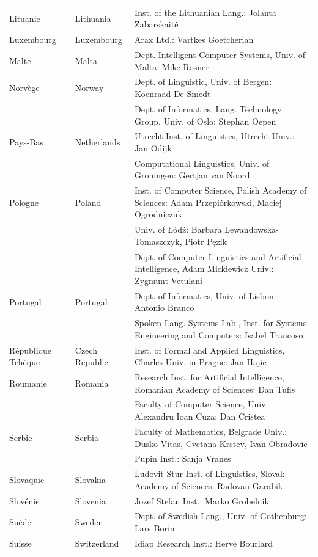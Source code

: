 \begin{longtable}{llp{105mm}}
  Lituanie & \textcolor{grey1}{Lithuania} & Inst. of the Lithuanian Lang.: Jolanta Zabarskaitė\\ \addlinespace
  Luxembourg & \textcolor{grey1}{Luxembourg} & Arax Ltd.: Vartkes Goetcherian\\ \addlinespace
  Malte & \textcolor{grey1}{Malta} & Dept. Intelligent Computer Systems, Univ. of Malta: Mike Rosner\\ \addlinespace
  Norvège & \textcolor{grey1}{Norway} & Dept. of Linguistic, Univ. of Bergen: Koenraad De Smedt\\ \addlinespace 
  & & Dept. of Informatics, Lang. Technology Group, Univ. of Oslo: Stephan Oepen \\ \addlinespace
  Pays-Bas & \textcolor{grey1}{Netherlands} & Utrecht Inst. of Linguistics, Utrecht Univ.: Jan Odijk\\ \addlinespace 
  & & Computational Linguistics, Univ. of Groningen: Gertjan van Noord\\ \addlinespace
  Pologne & \textcolor{grey1}{Poland} & Inst. of Computer Science, Polish Academy of Sciences: Adam Przepiórkowski, Maciej Ogrodniczuk \\ \addlinespace
  & & Univ. of Łódź: Barbara Lewandowska-Tomaszczyk, Piotr Pęzik\\ \addlinespace
  & & Dept. of Computer Linguistics and Artificial Intelligence, Adam Mickiewicz Univ.: Zygmunt Vetulani \\ \addlinespace
  Portugal & \textcolor{grey1}{Portugal} & Dept. of Informatics, Univ. of Lisbon: Antonio Branco\\ \addlinespace
  & & Spoken Lang. Systems Lab., Inst. for Systems Engineering and Computers: Isabel Trancoso \\ \addlinespace
  République Tchèque& \textcolor{grey1}{Czech Republic} & Inst. of Formal and Applied Linguistics, Charles Univ. in Prague: Jan Hajic \\ \addlinespace
  Roumanie & \textcolor{grey1}{Romania} & Research Inst. for Artificial Intelligence, Romanian Academy of Sciences: Dan Tufis \\ \addlinespace
  & & Faculty of Computer Science, Univ. Alexandru Ioan Cuza: Dan Cristea \\ \addlinespace
  Serbie & \textcolor{grey1}{Serbia} & Faculty of Mathematics, Belgrade Univ.: Dusko Vitas, Cvetana Krstev, Ivan Obradovic \\ \addlinespace
  & & Pupin Inst.: Sanja Vranes \\ \addlinespace  
  Slovaquie & \textcolor{grey1}{Slovakia} & Ludovit Stur Inst. of Linguistics, Slovak Academy of Sciences: Radovan Garabik \\ \addlinespace 
  Slovénie & \textcolor{grey1}{Slovenia} & Jozef Stefan Inst.: Marko Grobelnik \\ \addlinespace 
  Suède & \textcolor{grey1}{Sweden} & Dept. of Swedish Lang., Univ. of Gothenburg: Lars Borin \\ \addlinespace 
  Suisse & \textcolor{grey1}{Switzerland} & Idiap Research Inst.: Hervé Bourlard 
\end{longtable}
\normalsize

